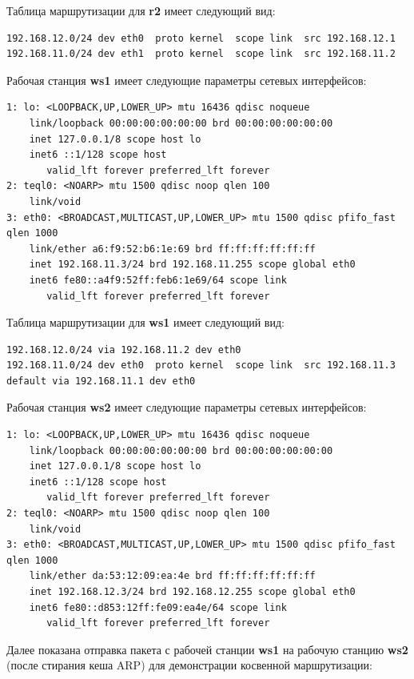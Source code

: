 \documentclass[a4paper,12pt]{article}
\begin{document}
Таблица маршрутизации для \textbf{r2} имеет следующий вид:

\begin{Verbatim}
192.168.12.0/24 dev eth0  proto kernel  scope link  src 192.168.12.1 
192.168.11.0/24 dev eth1  proto kernel  scope link  src 192.168.11.2
\end{Verbatim}

Рабочая станция \textbf{ws1} имеет следующие параметры сетевых интерфейсов:

\begin{Verbatim}
1: lo: <LOOPBACK,UP,LOWER_UP> mtu 16436 qdisc noqueue 
    link/loopback 00:00:00:00:00:00 brd 00:00:00:00:00:00
    inet 127.0.0.1/8 scope host lo
    inet6 ::1/128 scope host 
       valid_lft forever preferred_lft forever
2: teql0: <NOARP> mtu 1500 qdisc noop qlen 100
    link/void 
3: eth0: <BROADCAST,MULTICAST,UP,LOWER_UP> mtu 1500 qdisc pfifo_fast qlen 1000
    link/ether a6:f9:52:b6:1e:69 brd ff:ff:ff:ff:ff:ff
    inet 192.168.11.3/24 brd 192.168.11.255 scope global eth0
    inet6 fe80::a4f9:52ff:feb6:1e69/64 scope link 
       valid_lft forever preferred_lft forever
\end{Verbatim}

Таблица маршрутизации для \textbf{ws1} имеет следующий вид:

\begin{Verbatim}
192.168.12.0/24 via 192.168.11.2 dev eth0 
192.168.11.0/24 dev eth0  proto kernel  scope link  src 192.168.11.3 
default via 192.168.11.1 dev eth0
\end{Verbatim}

Рабочая станция \textbf{ws2} имеет следующие параметры сетевых интерфейсов:

\begin{Verbatim}
1: lo: <LOOPBACK,UP,LOWER_UP> mtu 16436 qdisc noqueue 
    link/loopback 00:00:00:00:00:00 brd 00:00:00:00:00:00
    inet 127.0.0.1/8 scope host lo
    inet6 ::1/128 scope host 
       valid_lft forever preferred_lft forever
2: teql0: <NOARP> mtu 1500 qdisc noop qlen 100
    link/void 
3: eth0: <BROADCAST,MULTICAST,UP,LOWER_UP> mtu 1500 qdisc pfifo_fast qlen 1000
    link/ether da:53:12:09:ea:4e brd ff:ff:ff:ff:ff:ff
    inet 192.168.12.3/24 brd 192.168.12.255 scope global eth0
    inet6 fe80::d853:12ff:fe09:ea4e/64 scope link 
       valid_lft forever preferred_lft forever
\end{Verbatim}

Далее показана отправка пакета с рабочей станции \textbf{ws1} на рабочую станцию
\textbf{ws2} (после стирания кеша ARP) для демонстрации косвенной маршрутизации:
\end{document}
